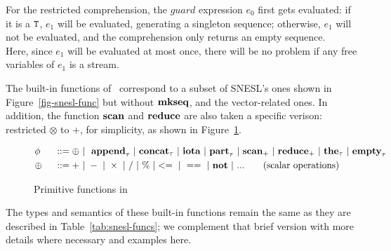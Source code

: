 For the restricted comprehension, the $guard$ expression $e_0$ first gets evaluated: if it is a $\mathtt{T}$, $e_1$ will be evaluated, generating a singleton sequence; otherwise, $e_1$ will not be evaluated, and the comprehension only returns an empty sequence. \\
Here, since $e_1$ will be evaluated at most once, there will be no problem if any free variables of $e_1$ is a stream.

The built-in functions of \mysnesl \ correspond to a subset of SNESL's ones shown in Figure~\ref{fig-snesl-func} but without $\mathbf{mkseq}$, and the vector-related ones. 
In addition, the function $\mathbf{scan}$ and $\mathbf{reduce}$ are also
taken a specific verison: restricted $\otimes$ to +, for simplicity, as shown in Figure~\ref{fig-mysnesl-func}. 


\begin{figure}[H]\large
	\begin{alignat*}{2} 
	&\phi && ::= \oplus \ | \  \ \mathbf{append}_{\tau} \ | \ \mathbf{concat}_{\tau}  \ | \ \mathbf{iota}  \ | \ \mathbf{part}_{\tau}  \ | \ \mathbf{scan}_+ \ | \ \mathbf{reduce}_{+} \ | \ \mathbf{the}_{\tau}  \ | \ \mathbf{empty}_{\tau} \\	
	& \oplus  \ && :: = + \ | \ - \ | \ \times \ |  \  / \ | \ \% \ | <= \ | \ == \ | \  \mathbf{not} \ | \ ... \tag{scalar operations} 
	\end{alignat*}
	\caption{Primitive functions in \mysnesl \label{fig-mysnesl-func}}
\end{figure}

The types and semantics of these built-in functions remain the same as they are described in Table~\ref{tab:snesl-funcs}; we complement that brief version with more details where necessary and examples here.

